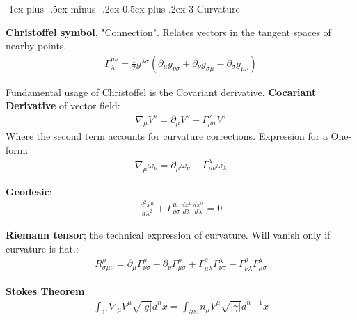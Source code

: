 \documentclass[10pt,landscape,a4paper]{article}
\makeatletter
\newcommand{\der}[2] {\frac{d #1}{d #2}}
\newcommand{\dder}[2] {\frac{d^2 #1}{d #2^2}}
\renewcommand{\section}{\@startsection{section}{1}{0mm}%
                                {-1ex plus -.5ex minus -.2ex}%
                                {0.5ex plus .2ex}%
                                {\normalfont\large\bfseries}}
\makeatother
\begin{document}
\begin{multicols}{3}

\section{3 Curvature}

\textbf{Christoffel symbol}, "Connection". Relates vectors in the tangent spaces of nearby points.
\begin{align}
    \Gamma_{\lambda}^{\mu\nu} = \frac{1}{2} g^{\lambda \sigma} (\partial_{\mu}g_{\nu\sigma}+\partial_{\nu}g_{\sigma\mu}-\partial_{\sigma}g_{\mu\nu})
\end{align}

Fundamental usage of Christoffel is the Covariant derivative. \textbf{Cocariant Derivative} of vector field:
\begin{align}
    \nabla_{\mu}V^{\nu}=\partial_\mu V^{\nu}+\Gamma^{\nu}_{\mu\sigma}V^{\sigma}
\end{align}
Where the second term accounts for curvature corrections. Expression for a One-form:
\begin{align}
        \nabla_{\mu}\omega_{\nu}=\partial_\mu \omega_{\nu}-\Gamma^{\lambda}_{\mu\nu}\omega_{\lambda}
\end{align}

\textbf{Geodesic}:
\begin{align}
    \dder{x^{\mu}}{\lambda}+\Gamma^{\mu}_{\rho\sigma} \der{x^{\rho}}{\lambda}\der{x^{\sigma}}{\lambda}=0
\end{align}

\textbf{Riemann tensor}; the technical expression of curvature. Will vanish only if curvature is flat.:
\begin{align}
    R^{\rho}_{\sigma\mu\nu}=\partial_{\mu}\Gamma^{\rho}_{\nu\sigma}-\partial_{\nu}\Gamma^{\rho}_{\mu\sigma}+\Gamma^{\rho}_{\mu\lambda}\Gamma^{\lambda}_{\nu\sigma}-\Gamma^{\rho}_{\nu\lambda}\Gamma^{\lambda}_{\mu\sigma}
\end{align}

\textbf{Stokes Theorem}:
\begin{align}
    \int_{\Sigma} \nabla_{\mu}V^{\mu}\sqrt{|g|}d^nx=\int_{\partial \Sigma} n_{\mu}V^{\mu}\sqrt{|\gamma|}d^{n-1}x
\end{align}


\end{multicols}
\end{document}
